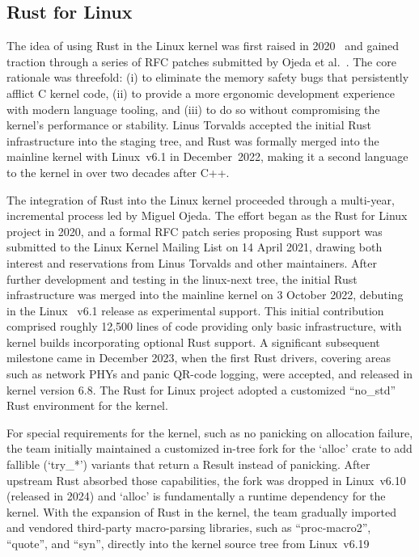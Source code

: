 \subsection{Rust for Linux}

The idea of using Rust in the Linux kernel was first raised in 2020~\cite{TODO:rfl_initial_rfc} and gained traction through a series of RFC patches submitted by Ojeda et al.~\cite{TODO:ojeda2022rust}.
The core rationale was threefold: (i) to eliminate the memory safety bugs that
persistently afflict C kernel code, (ii) to provide a more ergonomic development
experience with modern language tooling, and (iii) to do so without compromising
the kernel's performance or stability.
Linus Torvalds accepted the initial Rust infrastructure into the staging tree,
and Rust was formally merged into the mainline kernel with Linux~v6.1 in December~2022, making it a second language to the kernel in over two decades after C++.


The integration of Rust into the Linux kernel proceeded through a multi-year, incremental process led by Miguel Ojeda. 
The effort began as the Rust for Linux project in 2020, and a formal RFC patch series proposing Rust support was submitted to the Linux Kernel Mailing List on 14 April 2021, drawing both interest and reservations from Linus Torvalds and other maintainers. 
After further development and testing in the linux-next tree, the initial Rust infrastructure was merged into the mainline kernel on 3 October 2022, debuting in the Linux
~v6.1 release as experimental support. This initial contribution comprised roughly 12,500 lines of code providing only basic infrastructure, with kernel builds incorporating optional Rust support. 
A significant subsequent milestone came in December 2023, when the first Rust drivers, covering areas such as network PHYs and panic QR-code logging, were accepted, and released in kernel version 6.8. 
The Rust for Linux project adopted a customized ``no\_std'' Rust environment for the kernel. 

For special requirements for the kernel, such as no panicking on allocation failure, the team initially maintained a customized in-tree fork for the `alloc' crate to add fallible (`try\_*') variants that return a Result instead of panicking.
After upstream Rust absorbed those capabilities, the fork was dropped in Linux~v6.10 (released in 2024) and `alloc' is fundamentally a runtime dependency for the kernel. 
With the expansion of Rust in the kernel, the team gradually imported and vendored third-party macro-parsing libraries, such as ``proc-macro2'', ``quote'', and ``syn'', directly into the kernel source tree from Linux~v6.19


